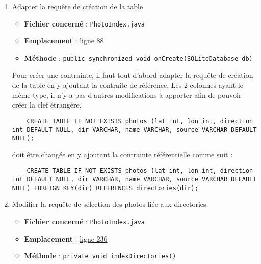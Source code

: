 \begin{enumerate}
    \item Adapter la requête de création de la table
    \begin{itemize}
        \item \textbf{Fichier concerné} : \texttt{PhotoIndex.java}
        \item \textbf{Emplacement} : \href{https://github.com/MarcusWolschon/osmeditor4android/blob/127fb689ad42c77558e4512e14de754e0561cd27/src/main/java/de/blau/android/photos/PhotoIndex.java#L88}{ligne 88}
        \item \textbf{Méthode} : \texttt{public synchronized void onCreate(SQLiteDatabase db)}
    \end{itemize}

    Pour créer une contrainte, il faut tout d'abord adapter la requête de création de la table en y ajoutant la contraite de référence.
    Les 2 colonnes ayant le même type, il n'y a pas d'autres modifications à apporter afin de pouvoir créer la clef étrangère.
    \begin{verbatim}
    CREATE TABLE IF NOT EXISTS photos (lat int, lon int, direction int DEFAULT NULL, dir VARCHAR, name VARCHAR, source VARCHAR DEFAULT NULL);
    \end{verbatim}

    doit être changée en y ajoutant la contrainte référentielle comme suit :
    \begin{verbatim}
    CREATE TABLE IF NOT EXISTS photos (lat int, lon int, direction int DEFAULT NULL, dir VARCHAR, name VARCHAR, source VARCHAR DEFAULT NULL) FOREIGN KEY(dir) REFERENCES directories(dir);
    \end{verbatim}

    \item Modifier la requête de sélection des photos liée aux directories.
    \begin{itemize}
        \item \textbf{Fichier concerné} : \texttt{PhotoIndex.java}
        \item \textbf{Emplacement} : \href{https://github.com/MarcusWolschon/osmeditor4android/blob/127fb689ad42c77558e4512e14de754e0561cd27/src/main/java/de/blau/android/photos/PhotoIndex.java#L236}{ligne 236}
        \item \textbf{Méthode} : \texttt{private void indexDirectories()}
    \end{itemize}


\end{enumerate}
